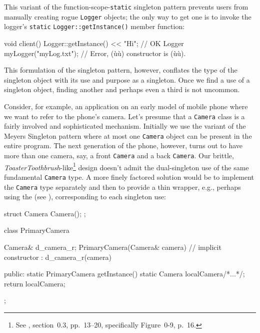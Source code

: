 \noindent This variant of the function-scope-\lstinline!static! singleton pattern
prevents users from manually creating rogue \lstinline!Logger! objects; the
only way to get one is to invoke the logger's \lstinline!static!
\lstinline!Logger::getInstance()! member function:

\begin{emcppslisting}[emcppsbatch=e10]
void client()
{
    Logger::getInstance() << "Hi";  // OK
    Logger myLogger("myLog.txt");   // Error, (ù{}ù) constructor is (ù{}ù).
}
\end{emcppslisting}

\noindent This formulation of the singleton pattern, however, conflates the type
of the singleton object with its use and purpose as a singleton. Once we
find a use of a singleton object, finding another and perhaps even a
third is not uncommon.

Consider, for example, an application on an early
model of mobile phone where we want to refer to the phone's camera.
Let's presume that a \lstinline!Camera! class is a fairly involved and
sophisticated mechanism. Initially we use the variant of the Meyers
Singleton pattern where at most one \lstinline!Camera! object can be
present in the entire program. The next generation of the phone, however, turns out to have more than
one camera, say, a front \lstinline!Camera! and a back \lstinline!Camera!. Our
brittle, \emph{ToasterToothbrush}-like\footnote{See \cite{lakos20}, section~0.3, pp.~13--20, specifically
Figure~0-9, p.~16.} design doesn't
admit the dual-singleton use of the same fundamental \lstinline!Camera!
type. A more finely factored solution would be to implement the
\lstinline!Camera! type separately and then to provide a thin wrapper,
e.g., perhaps using the  (see ), corresponding to each singleton
use:

\begin{emcppshiddenlisting}[emcppsbatch=e11]
struct Camera {
  Camera();
};    
\end{emcppshiddenlisting}
\begin{emcppslisting}[emcppsbatch=e11]
class PrimaryCamera
{
    Camera& d_camera_r;
    PrimaryCamera(Camera& camera)  // implicit constructor
      : d_camera_r(camera) { }  

public:
    static PrimaryCamera getInstance()
    {
        static Camera localCamera{/*...*/};
        return localCamera;
    }
};
\end{emcppslisting}

